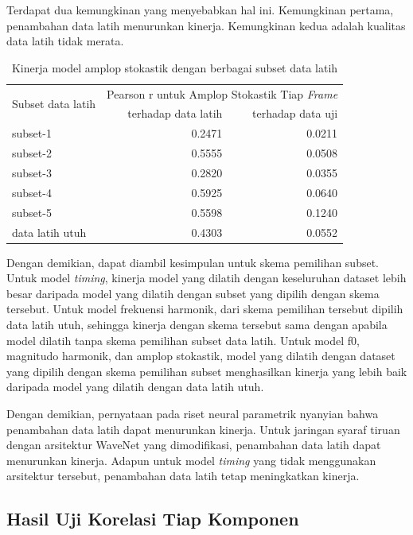 Terdapat dua kemungkinan yang menyebabkan hal ini. Kemungkinan pertama, penambahan data latih menurunkan kinerja. Kemungkinan kedua adalah kualitas data latih tidak merata.

\begin{table}[htbp]
    \centering
    \caption{Kinerja model amplop stokastik dengan berbagai subset data latih}\label{tab-stoc-model-subset-results}
    \begin{tabular}{ |l|r|r| } 
     \hline
     \multirow{2}{*}{Subset data latih} & \multicolumn{2}{l|}{Pearson r untuk Amplop Stokastik Tiap \textit{Frame}} \\
     \cline{2-3}
     & terhadap data latih & terhadap data uji \\\hline
	subset-1       &0.2471  &0.0211\\\hline
	subset-2       &0.5555  &0.0508\\\hline
	subset-3       &0.2820  &0.0355\\\hline
	subset-4       &0.5925  &0.0640\\\hline
	subset-5       &0.5598  &0.1240\\\hline
	data latih utuh       &0.4303  &0.0552\\\hline
    \end{tabular}
\end{table}

Dengan demikian, dapat diambil kesimpulan untuk skema pemilihan subset. Untuk model \textit{timing}, kinerja model yang dilatih dengan keseluruhan dataset lebih besar daripada model yang dilatih dengan subset yang dipilih dengan skema tersebut. Untuk model frekuensi harmonik, dari skema pemilihan tersebut dipilih data latih utuh, sehingga kinerja dengan skema tersebut sama dengan apabila model dilatih tanpa skema pemilihan subset data latih. Untuk model f0, magnitudo harmonik, dan amplop stokastik, model yang dilatih dengan dataset yang dipilih dengan skema pemilihan subset menghasilkan kinerja yang lebih baik daripada model yang dilatih dengan data latih utuh.

Dengan demikian, pernyataan pada riset neural parametrik nyanyian bahwa penambahan data latih dapat menurunkan kinerja. Untuk jaringan syaraf tiruan dengan arsitektur WaveNet yang dimodifikasi, penambahan data latih dapat menurunkan kinerja. Adapun untuk model \textit{timing} yang tidak menggunakan arsitektur tersebut, penambahan data latih tetap meningkatkan kinerja.

\subsection{Hasil Uji Korelasi Tiap Komponen}

